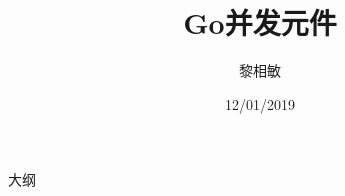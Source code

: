 \documentclass{beamer}
\title{Go并发元件}
\author{黎相敏}
\institute{上海观源信息科技有限公司 \\ 上海市闵行区紫竹科技园4号楼303B}
\date{12/01/2019}
\begin{document}
    \begin{frame}
        \maketitle
    \end{frame}

    \begin{frame}{大纲}
        \tableofcontents
    \end{frame}

    

    
    
    
    
    
    
    
    
    
\end{document}
